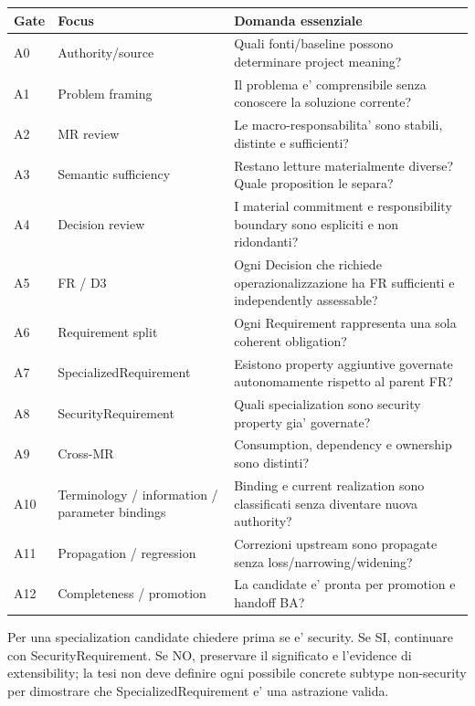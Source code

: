 \documentclass[11pt,a4paper]{article}
\begin{document}
\begin{longtable}{L{18mm}L{52mm}L{76mm}}
\toprule
\textbf{Gate} & \textbf{Focus} & \textbf{Domanda essenziale} \\
\midrule\endhead
A0 & Authority/source & Quali fonti/baseline possono determinare project meaning? \\
A1 & Problem framing & Il problema e' comprensibile senza conoscere la soluzione corrente? \\
A2 & MR review & Le macro-responsabilita' sono stabili, distinte e sufficienti? \\
A3 & Semantic sufficiency & Restano letture materialmente diverse? Quale proposition le separa? \\
A4 & Decision review & I material commitment e responsibility boundary sono espliciti e non ridondanti? \\
A5 & FR / D3 & Ogni Decision che richiede operazionalizzazione ha FR sufficienti e independently assessable? \\
A6 & Requirement split & Ogni Requirement rappresenta una sola coherent obligation? \\
A7 & SpecializedRequirement & Esistono property aggiuntive governate autonomamente rispetto al parent FR? \\
A8 & SecurityRequirement & Quali specialization sono security property gia' governate? \\
A9 & Cross-MR & Consumption, dependency e ownership sono distinti? \\
A10 & Terminology / information / parameter bindings & Binding e current realization sono classificati senza diventare nuova authority? \\
A11 & Propagation / regression & Correzioni upstream sono propagate senza loss/narrowing/widening? \\
A12 & Completeness / promotion & La candidate e' pronta per promotion e handoff BA? \\
\bottomrule
\end{longtable}

\begin{ddtaexample}[title={A7 nel perimetro della tesi}]
Per una specialization candidate chiedere prima se e' security. Se SI, continuare con SecurityRequirement. Se NO, preservare il significato e l'evidence di extensibility; la tesi non deve definire ogni possibile concrete subtype non-security per dimostrare che SpecializedRequirement e' una astrazione valida.
\end{ddtaexample}
\end{document}
